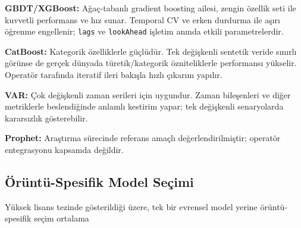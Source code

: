 \textbf{GBDT/XGBoost:} Ağaç-tabanlı gradient boosting ailesi, zengin özellik seti ile kuvvetli performans ve hız sunar. Temporal CV ve erken durdurma ile aşırı öğrenme engellenir; \texttt{lags} ve \texttt{lookAhead} işletim anında etkili parametrelerdir.

\textbf{CatBoost:} Kategorik özelliklerle güçlüdür. Tek değişkenli sentetik veride sınırlı görünse de gerçek dünyada türetik/kategorik özniteliklerle performansı yükselir. Operatör tarafında iteratif ileri bakışla hızlı çıkarım yapılır.

\textbf{VAR:} Çok değişkenli zaman serileri için uygundur. Zaman bileşenleri ve diğer metriklerle beslendiğinde anlamlı kestirim yapar; tek değişkenli senaryolarda kararsızlık gösterebilir.

\textbf{Prophet:} Araştırma sürecinde referans amaçlı değerlendirilmiştir; operatör entegrasyonu kapsamda değildir.

\subsection{Örüntü-Spesifik Model Seçimi}

Yüksek lisans tezinde gösterildiği üzere, tek bir evrensel model yerine örüntü-spesifik seçim ortalama %
